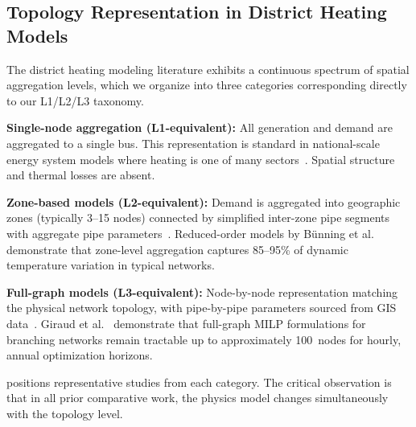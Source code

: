 \documentclass[review,3p]{elsarticle}
\begin{document}
\subsection{Topology Representation in District Heating Models}
\label{sec:rw_topology}

The district heating modeling literature exhibits a continuous
spectrum of spatial aggregation levels, which we organize into
three categories corresponding directly to our L1/L2/L3 taxonomy.

\textbf{Single-node aggregation (L1-equivalent):} All generation
and demand are aggregated to a single bus. This representation
is standard in national-scale energy system models where heating
is one of many sectors~\cite{Connolly2014_EnergyPLAN,Brown2018_pypsa,
Lund2017_SmartEnergy}. Spatial structure and thermal losses are absent.

\textbf{Zone-based models (L2-equivalent):} Demand is aggregated
into geographic zones (typically 3--15 nodes) connected by simplified
inter-zone pipe segments with aggregate pipe parameters~\cite{Wirtz2020,
Mertz2016,Buffa2019}. Reduced-order models by Bünning et
al.~\cite{Buenning2020} demonstrate that zone-level aggregation
captures 85--95\% of dynamic temperature variation in typical networks.

\textbf{Full-graph models (L3-equivalent):} Node-by-node
representation matching the physical network topology, with
pipe-by-pipe parameters sourced from GIS data~\cite{Vesterlund2017,
Schweiger2017,vanderHeijde2017,Blommaert2020}. Giraud et
al.~\cite{Giraud2015} demonstrate that full-graph MILP formulations
for branching networks remain tractable up to approximately 100~nodes
for hourly, annual optimization horizons.

 positions representative studies from each
category. The critical observation is that in all prior comparative
work, the physics model changes simultaneously with the topology
level.
\end{document}
